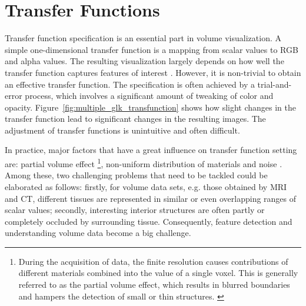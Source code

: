 \documentclass{egpubl}
\begin{document}
\section{Transfer Functions}
Transfer function specification is an essential part in volume visualization.
A simple one-dimensional transfer function is a mapping from scalar values to RGB and alpha values.
The resulting visualization largely depends on how well the transfer function captures features of interest \cite{kniss_multidimensional_2002}.
However, it is non-trivial to obtain an effective transfer function. The specification is often achieved by a trial-and-error process, which involves a significant amount of tweaking of color and opacity. Figure~\ref{fig:multiple_glk_transfunction} shows how slight changes in the transfer function lead to significant changes in the resulting images. The adjustment of transfer functions is unintuitive and often difficult.

In practice, major factors that have a great influence on transfer function setting are: partial volume effect \footnote{During the acquisition of data, the finite resolution causes contributions of different materials combined into the value of a single voxel. This is generally referred to as the partial volume effect, which results in blurred boundaries and hampers the detection of small or thin structures. \cite{serlie_classifying_2007}}, non-uniform distribution of materials and noise \cite{serlie_computed_2003}.
Among these, two challenging problems that need to be tackled could be elaborated as follows: firstly, for volume data sets, e.g. those obtained by MRI and CT, different tissues are represented in similar or even overlapping ranges of scalar values; secondly, interesting interior structures are often partly or completely occluded by surrounding tissue.
Consequently, feature detection and understanding volume data become a big challenge.
\end{document}
